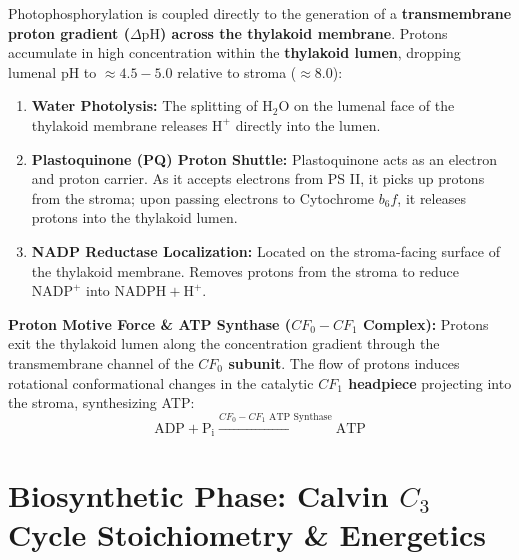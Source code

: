 \documentclass[10pt,twoside,openright]{book}
\begin{document}
\begin{conceptbox}
Photophosphorylation is coupled directly to the generation of a \textbf{transmembrane proton gradient ($\Delta \mathrm{pH}$) across the thylakoid membrane}. Protons accumulate in high concentration within the \textbf{thylakoid lumen}, dropping lumenal pH to $\approx 4.5-5.0$ relative to stroma ($\approx 8.0$):
\begin{enumerate}[leftmargin=*]
  \item \textbf{Water Photolysis:} The splitting of $\mathrm{H}_2\mathrm{O}$ on the lumenal face of the thylakoid membrane releases $\mathrm{H}^+$ directly into the lumen.
  \item \textbf{Plastoquinone (PQ) Proton Shuttle:} Plastoquinone acts as an electron and proton carrier. As it accepts electrons from PS II, it picks up protons from the stroma; upon passing electrons to Cytochrome $b_6f$, it releases protons into the thylakoid lumen.
  \item \textbf{NADP Reductase Localization:} Located on the stroma-facing surface of the thylakoid membrane. Removes protons from the stroma to reduce $\mathrm{NADP}^+$ into $\mathrm{NADPH} + \mathrm{H}^+$.
\end{enumerate}

\textbf{Proton Motive Force \& ATP Synthase ($CF_0-CF_1$ Complex):}
Protons exit the thylakoid lumen along the concentration gradient through the transmembrane channel of the \textbf{$CF_0$ subunit}. The flow of protons induces rotational conformational changes in the catalytic \textbf{$CF_1$ headpiece} projecting into the stroma, synthesizing ATP:
\begin{equation}
  \mathrm{ADP} + \mathrm{P_i} \xrightarrow{CF_0-CF_1 \text{ ATP Synthase}} \mathrm{ATP}
\end{equation}
\end{conceptbox}

\section{Biosynthetic Phase: Calvin $C_3$ Cycle Stoichiometry \& Energetics}
\end{document}
